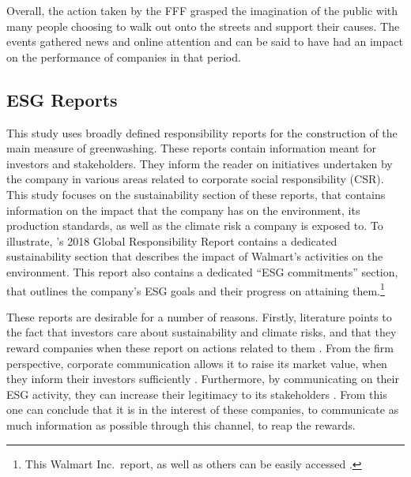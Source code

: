 \documentclass[12pt]{article}
\begin{document}
Overall, the action taken by the FFF grasped the imagination of the public with many people choosing to walk out onto the streets and support their causes. The events gathered news and online attention and can be said to have had an impact on the performance of companies in that period.


\subsection{ESG Reports}


This study uses broadly defined responsibility reports for the construction of the main measure of greenwashing. These reports contain information meant for investors and stakeholders. They inform the reader on initiatives undertaken by the company in various areas related to corporate social responsibility (CSR). This study focuses on the sustainability section of these reports, that contains information on the impact that the company has on the environment, its production standards, as well as the climate risk a company is exposed to. To illustrate, \citeauthor{walmart2018csr}'s 2018 Global Responsibility Report contains a dedicated sustainability section that describes the impact of Walmart's activities on the environment. This report also contains a dedicated ``ESG commitments'' section, that outlines the company's ESG goals and their progress on attaining them.\footnote{This Walmart Inc.~report, as well as others can be easily accessed \href{https://www.responsibilityreports.com/Company/walmart-inc}{}.}

These reports are desirable for a number of reasons. Firstly, literature points to the fact that investors care about sustainability and climate risks, and that they reward companies when these report on actions related to them \parencite{ilhanClimateRiskDisclosure2023,kruegerImportanceClimateRisks2020,pastorSustainableInvestingEquilibrium2021,testaDoesItPay2018}. From the firm perspective, corporate communication allows it to raise its market value, when they inform their investors sufficiently \parencite{servaesImpactCorporateSocial2013}. Furthermore, by communicating on their ESG activity, they can increase their legitimacy to its stakeholders \parencite{torelliGreenwashingEnvironmentalCommunication2020}. From this one can conclude that it is in the interest of these companies, to communicate as much information as possible through this channel, to reap the rewards. 
\end{document}
